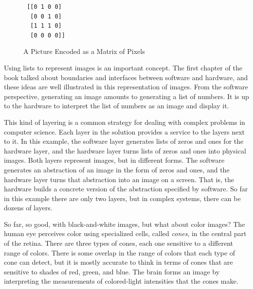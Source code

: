\begin{figure}
\begin{center}
\begin{minipage}{3cm}
\begin{verbatim}
 [[0 1 0 0]
  [0 0 1 0]
  [1 1 1 0]
  [0 0 0 0]]
\end{verbatim}
\end{minipage}%
\begin{minipage}{3cm}
\end{minipage}
\end{center}
\caption{A Picture Encoded as a Matrix of Pixels}
\label{fig:glider-in-images}
\end{figure}

Using lists to represent images is an important concept.
The first chapter of the book talked about boundaries
and interfaces between software and hardware, and these ideas are
well illustrated in this representation of images.
From the software perspective,
generating an image amounts to generating a list of numbers.
It is up to the hardware to interpret the list of numbers
as an image and display it.

This kind of layering is a common strategy for dealing
with complex problems in computer science.
Each layer in the solution provides a service
to the layers next to it. In this example,
the software layer generates lists of zeros and ones
for the hardware layer, and
the hardware layer turns lists of zeros and ones into physical images.
Both layers represent images, but in different forms.
The software generates an abstraction of an image
in the form of zeros and ones,
and the hardware layer turns that abstraction into an
image on a screen. That is, the hardware builds a
concrete version of the abstraction specified by software.
So far in this example there are only two layers,
but in complex systems, there can be dozens of layers.

So far, so good, with black-and-white images,
but what about color images?
The human eye perceives
color using specialized cells, called \emph{cones}, in the central
part of the retina. There are three types of cones, each one sensitive
to a different range of colors. There is some overlap in the range
of colors that each type of cone can detect, but it is mostly accurate
to think in terms of cones that are sensitive to shades of red, green,
and blue. The brain forms an image by interpreting 
the measurements of colored-light intensities that the cones make.


